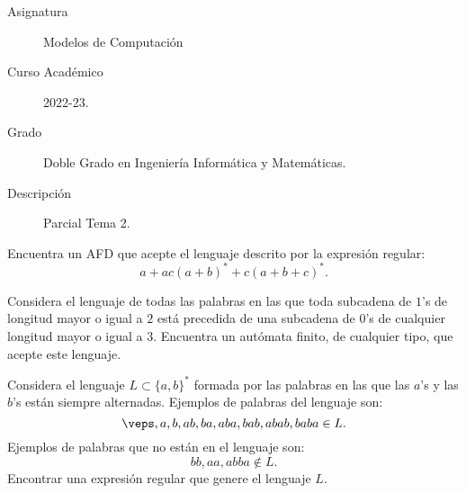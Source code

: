\documentclass[12pt]{article}
\begin{document}

    
    

    \begin{description}
        \item[Asignatura] Modelos de Computación
        \item[Curso Académico] 2022-23.
        \item[Grado] Doble Grado en Ingeniería Informática y Matemáticas.
        \item[Descripción] Parcial Tema 2.
    \end{description}
    \newpage
    
    \begin{ejercicio}
        Encuentra un AFD que acepte el lenguaje descrito por la expresión regular:
        \begin{equation*}
            a+ac(a+b)^* + c(a+b+c)^*.
        \end{equation*}
    \end{ejercicio}

    \begin{ejercicio}
        Considera el lenguaje de todas las palabras en las que toda subcadena de $1$'s de longitud mayor o igual a $2$ está precedida de una subcadena de $0$'s de cualquier longitud mayor o igual a $3$. Encuentra un autómata finito, de cualquier tipo, que acepte este lenguaje.
    \end{ejercicio}

    \begin{ejercicio}
        Considera el lenguaje $L\subset \{a,b\}^*$ formada por las palabras en las que las $a$'s y las $b$'s están siempre alternadas. Ejemplos de palabras del lenguaje son:
        \begin{equation*}
            \veps,a,b,ab,ba,aba,bab,abab,baba \in L.
        \end{equation*}
        Ejemplos de palabras que no están en el lenguaje son:
        \begin{equation*}
            bb,aa,abba \notin L.
        \end{equation*}
        Encontrar una expresión regular que genere el lenguaje $L$.
    \end{ejercicio}
\end{document}

